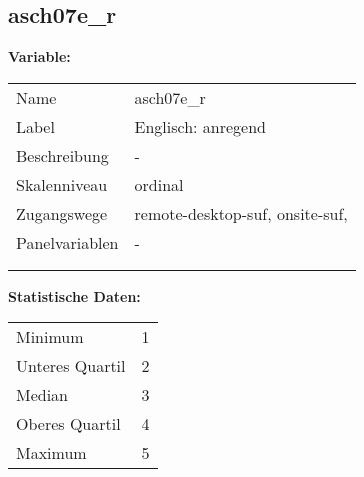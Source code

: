 	
	
	\subsection{asch07e\_r}
	\label{subSection:asch07e_r}

	\noindent\textbf{Variable:}\\
		\begin{tabular}{lL{11.3cm}}
			\label{tableVariable:asch07e_r}
			Name & asch07e\_r \\
			Label & Englisch: anregend \\
			Beschreibung & - \\
			Skalenniveau & ordinal \\
			Zugangswege &
				remote-desktop-suf,
				onsite-suf,
 \\
			Panelvariablen & -
			 \\
			 \\
 \\
		\end{tabular}



		\vspace*{1 cm}
		\noindent\textbf{Statistische Daten:}\\
			\begin{tabular}{ll}
				\label{tableStatistics:asch07e_r}
					Minimum & 1 \\
					Unteres Quartil & 2 \\
					Median & 3 \\
					Oberes Quartil & 4 \\
					Maximum & 5 \\
			\end{tabular}



